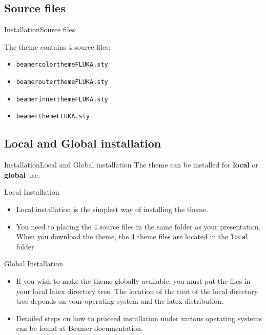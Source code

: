 \documentclass[10pt]{beamer}
\begin{document}
\subsection{Source files}
\begin{frame}{Installation}{Source files}

\begin{block}{}
The theme contains 4 source files:
  \begin{itemize}
    \item {\tt beamercolorthemeFLUKA.sty}
    \item {\tt beamerouterthemeFLUKA.sty}
    \item {\tt beamerinnerthemeFLUKA.sty}
    \item {\tt beamerthemeFLUKA.sty}
  \end{itemize}
\end{block}
\end{frame}

\subsection{Local and Global installation}
\begin{frame}{Installation}{Local and Global installation}
  The theme can be installed for \textbf{local} or \textbf{global} use.
  \pause
  \begin{block}{Local Installation}
  \begin{itemize}
    \item Local installation is the simplest way of installing the theme.
    \item You need to placing the 4 source files in the same folder as your presentation. When you download the theme, the 4 theme files are located in the {\tt local} folder.
  \end{itemize}
  \end{block}

  \begin{block}{Global Installation}
  \begin{itemize}
     \item If you wish to make the theme globally available, you must put the files in your local latex directory tree. The location of the root of the local directory tree depends on your operating system and the latex distribution.
     \item Detailed steps on how to proceed installation under various operating systems can be found at Beamer documentation.
  \end{itemize}
  \end{block}
\end{frame}
\end{document}
